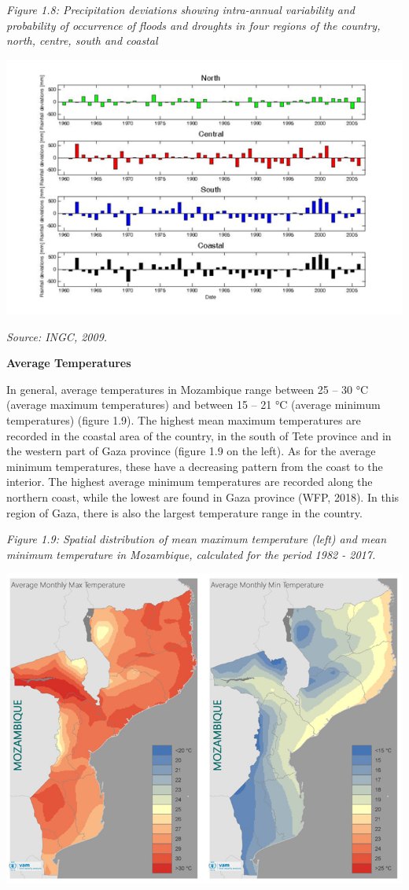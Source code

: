 \documentclass[
]{book}
\begin{document}
\emph{Figure 1.8: Precipitation deviations showing intra-annual variability and probability of occurrence of floods and droughts in four regions of the country, north, centre, south and coastal}

\includegraphics{Figure14.png}

\emph{Source: INGC, 2009.}

\textbf{Average Temperatures}

In general, average temperatures in Mozambique range between 25 -- 30 °C (average maximum temperatures) and between 15 -- 21 °C (average minimum temperatures) (figure 1.9). The highest mean maximum temperatures are recorded in the coastal area of the country, in the south of Tete province and in the western part of Gaza province (figure 1.9 on the left). As for the average minimum temperatures, these have a decreasing pattern from the coast to the interior. The highest average minimum temperatures are recorded along the northern coast, while the lowest are found in Gaza province (WFP, 2018). In this region of Gaza, there is also the largest temperature range in the country.

\emph{Figure 1.9: Spatial distribution of mean maximum temperature (left) and mean minimum temperature in Mozambique, calculated for the period 1982 - 2017.}

\includegraphics{Figure15.png}
\end{document}

